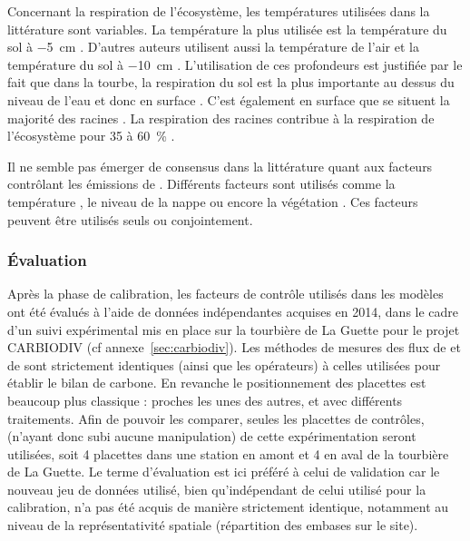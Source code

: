 Concernant la respiration de l'écosystème, les températures utilisées dans la littérature sont variables.
La température la plus utilisée est la température du sol à \SI{-5}{\centi\metre}  \citep{ballantyne2014}.
D'autres auteurs utilisent aussi la température de l'air et la température du sol à \SI{-10}{\centi\metre} \citep{bortoluzzi2006a,kim1992}.
L'utilisation de ces profondeurs est justifiée par le fait que dans la tourbe, la respiration du sol est la plus importante au dessus du niveau de l'eau et donc en surface \citep{Luo200661}. %
C'est également en surface que se situent la majorité des racines \citep{rydin2013c}.
La respiration des racines contribue à la respiration de l'écosystème pour 35 à \SI{60}{\percent} \citep{silvola1996,crow2005}.

Il ne semble pas émerger de consensus dans la littérature quant aux facteurs contrôlant les émissions de \chh.
Différents facteurs sont utilisés comme la température \citep{alm1999,bubier1995b}, le niveau de la nappe \citep{bubier1993} ou encore la végétation \citep{bortoluzzi2006a}.
Ces facteurs peuvent être utilisés seuls ou conjointement.

\subsubsection{Évaluation}

Après la phase de calibration, les facteurs de contrôle utilisés dans les modèles ont été évalués à l'aide de données indépendantes acquises en 2014, dans le cadre d'un suivi expérimental mis en place sur la tourbière de La Guette pour le projet CARBIODIV (cf annexe~\ref{sec:carbiodiv}).
Les méthodes de mesures des flux de \coo et de \chh sont strictement identiques (ainsi que les opérateurs) à celles utilisées pour établir le bilan de carbone.
En revanche le positionnement des placettes est beaucoup plus classique : proches les unes des autres, et avec différents traitements.
Afin de pouvoir les comparer, seules les placettes de contrôles, (n'ayant donc subi aucune manipulation) de cette expérimentation seront utilisées, soit 4 placettes dans une station en amont et 4 en aval de la tourbière de La Guette.
Le terme d'évaluation est ici préféré à celui de validation car le nouveau jeu de données utilisé, bien qu'indépendant de celui utilisé pour la calibration, n'a pas été acquis de manière strictement identique, notamment au niveau de la représentativité spatiale (répartition des embases sur le site).

